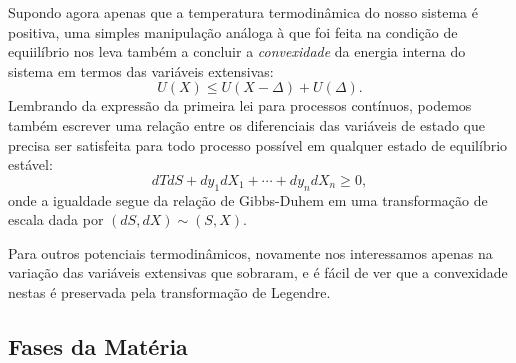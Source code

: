 Supondo agora apenas que a temperatura termodinâmica do nosso sistema é
positiva, uma simples manipulação análoga à que foi feita na condição de
equiilíbrio nos leva também a concluir a \emph{convexidade} da energia interna
do sistema em termos das variáveis extensivas:
$$U(X)\leq U(X-\Delta)+U(\Delta).$$
Lembrando da expressão da primeira lei para processos contínuos, podemos também
escrever uma relação entre os diferenciais das variáveis de estado que precisa
ser satisfeita para todo processo possível em qualquer estado de equilíbrio
estável:
$$dTdS+dy_1dX_1+\cdots+dy_ndX_n\geq0,$$
onde a igualdade segue da relação de Gibbs-Duhem em uma transformação de escala
dada por $(dS,dX)\sim(S,X)$.

Para outros potenciais termodinâmicos, novamente nos interessamos apenas na
variação das variáveis extensivas que sobraram, e é fácil de ver que a
convexidade nestas é preservada pela transformação de Legendre.

\subsection{Fases da Matéria}


